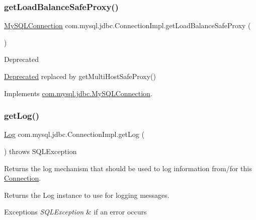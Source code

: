 \subsubsection{\texorpdfstring{get\+Load\+Balance\+Safe\+Proxy()}{getLoadBalanceSafeProxy()}}
{\footnotesize\ttfamily \mbox{\hyperlink{interfacecom_1_1mysql_1_1jdbc_1_1_my_s_q_l_connection}{My\+S\+Q\+L\+Connection}} com.\+mysql.\+jdbc.\+Connection\+Impl.\+get\+Load\+Balance\+Safe\+Proxy (\begin{DoxyParamCaption}{ }\end{DoxyParamCaption})}

\begin{DoxyRefDesc}{Deprecated}
\item[\mbox{\hyperlink{deprecated__deprecated000007}{Deprecated}}]replaced by {\ttfamily get\+Multi\+Host\+Safe\+Proxy()} \end{DoxyRefDesc}


Implements \mbox{\hyperlink{interfacecom_1_1mysql_1_1jdbc_1_1_my_s_q_l_connection_aefbe0aa8c5652ee9534dd5354c8af220}{com.\+mysql.\+jdbc.\+My\+S\+Q\+L\+Connection}}.

\mbox{\label{classcom_1_1mysql_1_1jdbc_1_1_connection_impl_ae8304e8374b4789fe5f73120bccb7143}} 
\subsubsection{\texorpdfstring{get\+Log()}{getLog()}}
{\footnotesize\ttfamily \mbox{\hyperlink{interfacecom_1_1mysql_1_1jdbc_1_1log_1_1_log}{Log}} com.\+mysql.\+jdbc.\+Connection\+Impl.\+get\+Log (\begin{DoxyParamCaption}{ }\end{DoxyParamCaption}) throws S\+Q\+L\+Exception}

Returns the log mechanism that should be used to log information from/for this \mbox{\hyperlink{interfacecom_1_1mysql_1_1jdbc_1_1_connection}{Connection}}.

\begin{DoxyReturn}{Returns}
the Log instance to use for logging messages. 
\end{DoxyReturn}

\begin{DoxyExceptions}{Exceptions}
{\em S\+Q\+L\+Exception} & if an error occurs \\
\hline
\end{DoxyExceptions}


